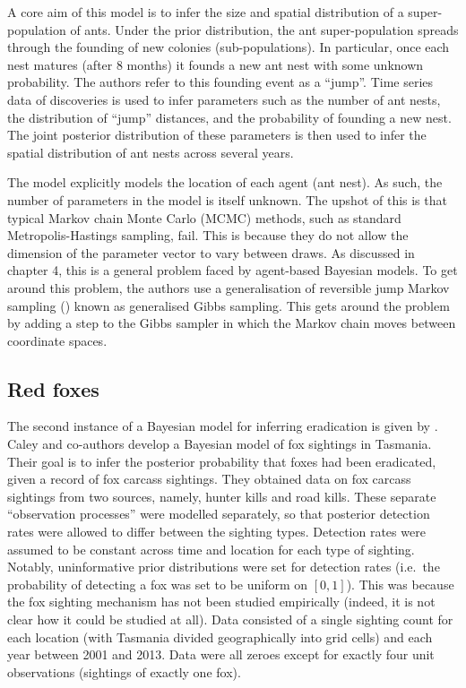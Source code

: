 \documentclass[
  oneside]{book}
\begin{document}
A core aim of this model is to infer the size and spatial distribution of a super-population of ants. Under the prior distribution, the ant super-population spreads through the founding of new colonies (sub-populations). In particular, once each nest matures (after 8 months) it founds a new ant nest with some unknown probability. The authors refer to this founding event as a ``jump''. Time series data of discoveries is used to infer parameters such as the number of ant nests, the distribution of ``jump'' distances, and the probability of founding a new nest. The joint posterior distribution of these parameters is then used to infer the spatial distribution of ant nests across several years.

The model explicitly models the location of each agent (ant nest). As such, the number of parameters in the model is itself unknown. The upshot of this is that typical Markov chain Monte Carlo (MCMC) methods, such as standard Metropolis-Hastings sampling, fail. This is because they do not allow the dimension of the parameter vector to vary between draws. As discussed in chapter 4, this is a general problem faced by agent-based Bayesian models. To get around this problem, the authors use a generalisation of reversible jump Markov sampling (\citet{green1995}) known as generalised Gibbs sampling. This gets around the problem by adding a step to the Gibbs sampler in which the Markov chain moves between coordinate spaces.

\hypertarget{red-foxes}{%
\subsection{Red foxes}\label{red-foxes}}

The second instance of a Bayesian model for inferring eradication is given by \citet{caley2015}. Caley and co-authors develop a Bayesian model of fox sightings in Tasmania. Their goal is to infer the posterior probability that foxes had been eradicated, given a record of fox carcass sightings. They obtained data on fox carcass sightings from two sources, namely, hunter kills and road kills. These separate ``observation processes'' were modelled separately, so that posterior detection rates were allowed to differ between the sighting types. Detection rates were assumed to be constant across time and location for each type of sighting. Notably, uninformative prior distributions were set for detection rates (i.e.~the probability of detecting a fox was set to be uniform on \([0, 1]\)). This was because the fox sighting mechanism has not been studied empirically (indeed, it is not clear how it could be studied at all). Data consisted of a single sighting count for each location (with Tasmania divided geographically into grid cells) and each year between 2001 and 2013. Data were all zeroes except for exactly four unit observations (sightings of exactly one fox).
\end{document}
